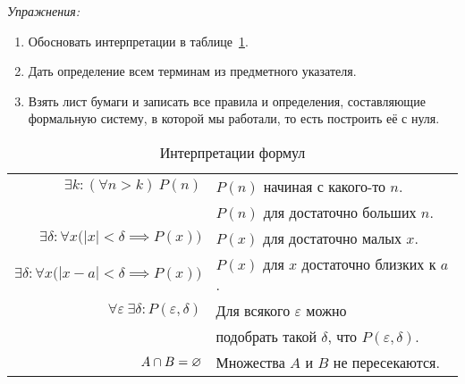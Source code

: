 \vspace{1em}
{\it Упражнения:}
\begin{enumerate}
  \item{}Обосновать интерпретации в таблице~\ref{table:formula_interp}.
  \item{}Дать определение всем терминам из предметного указателя.
  \item{}Взять лист бумаги и записать все правила и определения, составляющие
  формальную систему, в которой мы работали, то есть построить её с нуля.
\end{enumerate}

\begin{table}
  \centering
  \begin{tabular}{r|l}
    $\exists k:(\forall n>k)~P(n)$        & $P(n)$ начиная с какого-то $n$.      \\
                                          & $P(n)$ для достаточно больших $n$.   \\[1em]

    $\exists \delta:\forall x
    \big(|x|<\delta\implies P(x)\big)$    & $P(x)$ для достаточно малых $x$.     \\[1em]
		
    $\exists \delta:\forall x
    \big(|x-a|<\delta \implies P(x)\big)$ & $P(x)$ для $x$
    достаточно близких к $a$.                                                    \\[1em]

    $\forall \varepsilon~
    \exists \delta:P(\varepsilon,\delta)$ & Для всякого $\varepsilon$ можно      \\
                                          & подобрать такой $\delta$,
    что $P(\varepsilon,\delta)$.                                                 \\[1em]

    $A\cap B=\varnothing$                       & Множества $A$ и $B$ не пересекаются.
  \end{tabular}
  \caption{Интерпретации формул}\label{table:formula_interp}
\end{table}

\vspace{1em}

